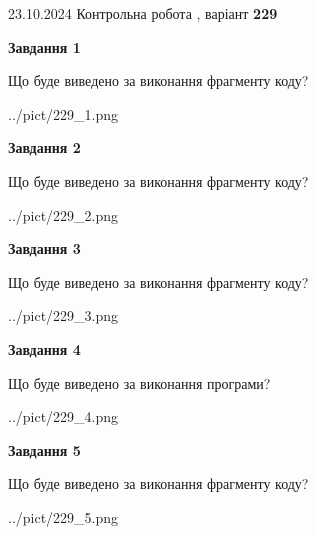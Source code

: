 \documentclass[12pt, ukrainian]{article}
\begin{document}
{\Large{23.10.2024 Контрольна робота , варіант  \No \textbf { 229 }\par}}
{
\begin {large}
{\begin {center}\textbf{Завдання 1}\end {center}}

Що буде виведено за виконання фрагменту коду?\par
\begin{center}
	{../pict/229_1.png}
\end{center}
\newpage

{\begin {center}\textbf{Завдання 2}\end {center}}

Що буде виведено за виконання фрагменту коду?\par
\begin{center}
	{../pict/229_2.png}
\end{center}
\newpage

{\begin {center}\textbf{Завдання 3}\end {center}}

Що буде виведено за виконання фрагменту коду?\par
\begin{center}
	{../pict/229_3.png}
\end{center}
\newpage

{\begin {center}\textbf{Завдання 4}\end {center}}

Що буде виведено за виконання програми?\par
\begin{center}
	{../pict/229_4.png}
\end{center}
\newpage

{\begin {center}\textbf{Завдання 5}\end {center}}

Що буде виведено за виконання фрагменту коду?\par
\begin{center}
	{../pict/229_5.png}
\end{center}
\newpage


\end{large}}
\end{document}
